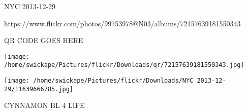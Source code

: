 \documentclass[10pt,letterpaper]{article}
\begin{document}
NYC 2013-12-29

https://www.flickr.com/photos/99753978@N03/albums/72157639181550343

QR CODE GOES HERE

\texttt{[image: /home/swickape/Pictures/flickr/Downloads/qr/72157639181550343.jpg]}
\pagebreak

\texttt{[image: /home/swickape/Pictures/flickr/Downloads/NYC 2013-12-29/11639666785.jpg]}

CYNNAMON BL 4 LIFE\\
\pagebreak
\end{document}

